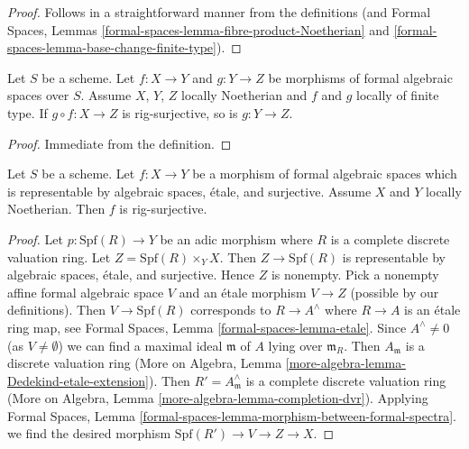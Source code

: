 \begin{proof}
Follows in a straightforward manner from the definitions (and
Formal Spaces, Lemmas \ref{formal-spaces-lemma-fibre-product-Noetherian} and
\ref{formal-spaces-lemma-base-change-finite-type}).
\end{proof}

\begin{lemma}
\label{lemma-permanence-rig-surjective}
Let $S$ be a scheme. Let $f : X \to Y$ and $g : Y \to Z$ be morphisms of
formal algebraic spaces over $S$. Assume $X$, $Y$, $Z$ locally Noetherian
and $f$ and $g$ locally of finite type. If $g \circ f : X \to Z$
is rig-surjective, so is $g : Y \to Z$.
\end{lemma}

\begin{proof}
Immediate from the definition.
\end{proof}

\begin{lemma}
\label{lemma-etale-covering-rig-surjective}
Let $S$ be a scheme. Let $f : X \to Y$ be a morphism of formal algebraic
spaces which is representable by algebraic spaces, \'etale, and surjective.
Assume $X$ and $Y$ locally Noetherian. Then $f$ is rig-surjective.
\end{lemma}

\begin{proof}
Let $p : \text{Spf}(R) \to Y$ be an adic morphism where $R$ is a complete
discrete valuation ring. Let $Z = \text{Spf}(R) \times_Y X$. Then
$Z \to \text{Spf}(R)$ is representable by algebraic spaces, \'etale, and
surjective. Hence $Z$ is nonempty. Pick a nonempty affine formal algebraic
space $V$ and an \'etale morphism $V \to Z$ (possible by our definitions).
Then $V \to \text{Spf}(R)$ corresponds to $R \to A^\wedge$ where
$R \to A$ is an \'etale ring map, see Formal Spaces, Lemma
\ref{formal-spaces-lemma-etale}. Since $A^\wedge \not = 0$
(as $V \not = \emptyset$) we can find a maximal ideal $\mathfrak m$
of $A$ lying over $\mathfrak m_R$. Then $A_\mathfrak m$ is a discrete
valuation ring (More on Algebra, Lemma
\ref{more-algebra-lemma-Dedekind-etale-extension}).
Then $R' = A_\mathfrak m^\wedge$ is a complete discrete valuation ring
(More on Algebra, Lemma \ref{more-algebra-lemma-completion-dvr}).
Applying Formal Spaces, Lemma
\ref{formal-spaces-lemma-morphism-between-formal-spectra}.
we find the desired morphism $\text{Spf}(R') \to V \to Z \to X$.
\end{proof}

